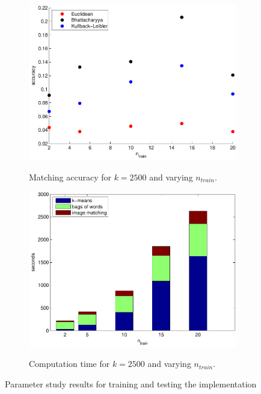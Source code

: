 \documentclass[11pt,a4paper]{article}
\begin{document}
\begin{figure}[H]
\begin{subfigure}[t]{0.48\textwidth}
        \includegraphics[width=\textwidth]{images/results_n_train.pdf}
        \label{fig:results_n_train}
        \caption{Matching accuracy for $k = 2500$ and varying $n_{train}$.}
    \end{subfigure}
    \begin{subfigure}[t]{0.48\textwidth}
        \includegraphics[width=\textwidth]{images/results_n_train_time.pdf}
        \label{fig:results_n_train_time}
        \caption{Computation time for $k = 2500$ and varying $n_{train}$.}
    \end{subfigure}
    \caption{Parameter study results for training and testing the
    implementation}
    \label{fig:parameter_results}
\end{figure}
\end{document}
